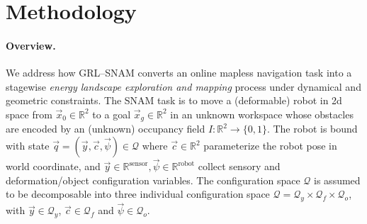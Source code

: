 \section{Methodology}
\label{sec:method}
\providecommand{\Ham}{\mathcal{H}}          %
\providecommand{\Energy}{\mathcal{E}}       %
\providecommand{\Potential}{\mathcal{R}}    %
\providecommand{\Constraints}{\mathcal{C}}  %
\providecommand{\Response}{\mathsf{R}}      %
\providecommand{\Navigator}{\mathsf{N}}     %
\providecommand{\PhaseState}{z}                  %
\providecommand{\Pos}{q}                    %
\providecommand{\Mom}{p}                    %
\providecommand{\Mass}{\mathrm{M}}          %
\providecommand{\J}{\mathbb{J}}             %
\providecommand{\Lag}{\mathscr{L}}          %
\providecommand{\res}{\mathbf{r}}           %
\providecommand{\mult}{\boldsymbol{\lambda}}%
\providecommand{\pen}{\boldsymbol{\rho}}    %




\paragraph{Overview.} 
We address how GRL--SNAM converts an online mapless navigation task into a stagewise {\emph{energy landscape exploration and mapping}} process under dynamical and geometric constraints. The SNAM task is to move a (deformable) robot in 2d space from $\vec x_0\in\mathbb R^2$ to a goal $\vec x_g\in\mathbb R^2$ in an unknown workspace whose obstacles are encoded by an (unknown) occupancy field $I:\mathbb R^2\to\{0,1\}$. The robot is bound with state $\vec q=(\vec y, \vec c, \vec\psi)\in \mathcal{Q}$ where $\vec c\in\mathbb R^2$ parameterize the robot pose in world coordinate, and $\vec y\in \mathbb{R}^{\text{sensor}},\vec\psi\in \mathbb{R}^{\text{robot}}$ collect sensory and deformation/object configuration variables. The configuration space $\mathcal{Q}$ is assumed to be decomposable into three individual configuration space $\mathcal{Q}=\mathcal{Q}_y\times \mathcal{Q}_f\times \mathcal{Q}_o$, with $\vec{y}\in\mathcal{Q}_y$, $\vec{c}\in \mathcal{Q}_f$ and $\vec\psi\in\mathcal{Q}_o$.

